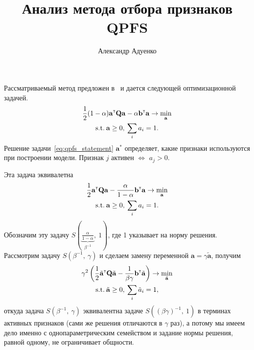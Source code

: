 \documentclass[12pt, a4paper]{article}
\title{Анализ метода отбора признаков QPFS}
\author{Александр Адуенко}
\newcommand{\T}{{\text{\tiny\sffamily\upshape\mdseries T}}}
\newcommand{\qmatr}{\mathbf{Q}}
\newcommand{\bvec}{\mathbf{b}}
\newcommand{\avec}{\mathbf{a}}
\begin{document}
\maketitle

Рассматриваемый метод предложен в~\cite{qpfs_original} и дается следующей оптимизационной задачей.
\begin{gather}
\label{eq:qpfs_statement}
\frac{1}{2}(1 - \alpha) \avec^{\T} \qmatr \avec - \alpha \bvec^{\T} \avec \to \min_{\avec}\\
\text{s.t.}\: \avec \geq 0,\:\sum_i a_i = 1.
\end{gather}
Решение задачи~\eqref{eq:qpfs_statement} $\avec^*$ определяет, какие признаки используются при построении модели. Признак $j$ активен $\Longleftrightarrow$ $a_j > 0$.

Эта задача эквивалетна
\begin{gather}
\label{eq:qpfs_statement_adj}
\frac{1}{2} \avec^{\T} \qmatr \avec - \frac{\alpha}{1-\alpha} \bvec^{\T} \avec \to \min_{\avec}\\
\text{s.t.}\: \avec \geq 0,\:\sum_i a_i = 1.
\end{gather}
Обозначим эту задачу $S\left(\underbrace{\frac{\alpha}{1 - \alpha}}_{\beta^{-1}},\:1\right)$, где 1 указывает на норму решения. Рассмотрим задачу $S(\beta^{-1},\:\gamma)$ и сделаем замену переменной $\avec = \gamma \tilde{\avec}$, получим
\begin{gather}
\gamma^2 \left(\frac{1}{2} \tilde{\avec}^{\T} \qmatr \tilde{\avec} - \frac{1}{\beta\gamma} \bvec^{\T} \tilde{\avec}\right) \to \min_{\tilde{\avec}}\\
\text{s.t.}\: \tilde{\avec} \geq 0,\:\sum_i \tilde{a}_i = 1,
\end{gather}
откуда задача $S(\beta^{-1},\:\gamma)$ эквивалентна задаче $S((\beta \gamma)^{-1},\:1)$ в терминах активных признаков (сами же решения отличаются в $\gamma$ раз), а потому мы имеем дело именно с однопараметрическим семейством и задание нормы решения, равной одному, не ограничивает общности.
\end{document}
